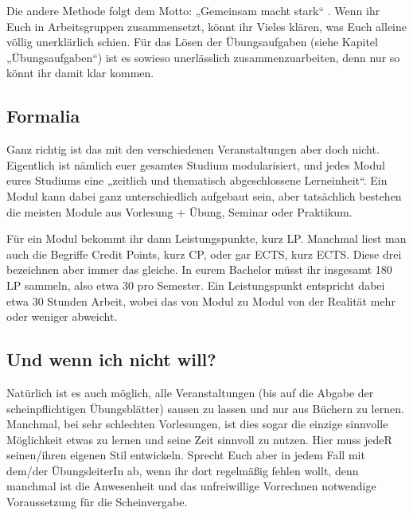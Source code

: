 Die andere Methode folgt dem Motto: „Gemeinsam macht stark“ . Wenn ihr Euch in Arbeitsgruppen zusammensetzt, könnt ihr Vieles klären, was Euch alleine völlig unerklärlich schien. Für das Lösen der Übungsaufgaben (siehe Kapitel „Übungsaufgaben“) ist es sowieso unerlässlich zusammenzuarbeiten, denn nur so könnt ihr damit klar kommen.

\subsection{Formalia}

Ganz richtig ist das mit den verschiedenen Veranstaltungen aber doch nicht. Eigentlich ist nämlich euer gesamtes Studium modularisiert, und jedes Modul eures Studiums eine „zeitlich und thematisch abgeschlossene Lerneinheit“. Ein Modul kann dabei ganz unterschiedlich aufgebaut sein, aber tatsächlich bestehen die meisten Module aus Vorlesung + Übung, Seminar oder Praktikum.

Für ein Modul bekommt ihr dann Leistungspunkte, kurz \gls{LP}. Manchmal liest man auch die Begriffe Credit Points, kurz \gls{CP}, oder gar \gls{ECTS}, kurz ECTS. Diese drei bezeichnen aber immer das gleiche. In eurem Bachelor müsst ihr insgesamt 180 \gls{LP} sammeln, also etwa 30 pro Semester. Ein Leistungspunkt entspricht dabei etwa 30 Stunden Arbeit, wobei das von Modul zu Modul von der Realität mehr oder weniger abweicht.

\subsection{Und wenn ich nicht will?}

Natürlich ist es auch möglich, alle Veranstaltungen (bis auf die Abgabe der scheinpflichtigen Übungsblätter) sausen zu lassen und nur aus Büchern zu lernen. Manchmal, bei sehr schlechten Vorlesungen, ist dies sogar die einzige sinnvolle Möglichkeit etwas zu lernen und seine Zeit sinnvoll zu nutzen. Hier muss jedeR seinen/ihren eigenen Stil entwickeln. Sprecht Euch aber in jedem Fall mit dem/der ÜbungsleiterIn ab, wenn ihr dort regelmäßig fehlen wollt, denn manchmal ist die Anwesenheit und das unfreiwillige Vorrechnen notwendige Voraussetzung für die Scheinvergabe.
